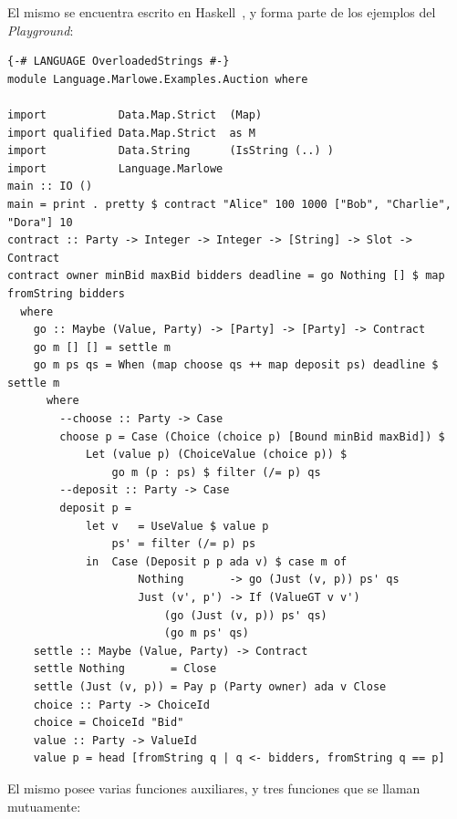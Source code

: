 \documentclass[12pt]{book}
\begin{document}
El mismo se encuentra escrito en Haskell~\cite{auction_haskell}, y forma parte de los ejemplos del \textit{Playground}:


\begin{lstlisting}[style=Haskell-cardano, caption=Contrato \textit{Auction} escrito en Marlowe]
{-# LANGUAGE OverloadedStrings #-}
module Language.Marlowe.Examples.Auction where

import           Data.Map.Strict  (Map)
import qualified Data.Map.Strict  as M
import           Data.String      (IsString (..) )
import           Language.Marlowe
main :: IO ()
main = print . pretty $ contract "Alice" 100 1000 ["Bob", "Charlie", "Dora"] 10
contract :: Party -> Integer -> Integer -> [String] -> Slot -> Contract
contract owner minBid maxBid bidders deadline = go Nothing [] $ map fromString bidders
  where
    go :: Maybe (Value, Party) -> [Party] -> [Party] -> Contract
    go m [] [] = settle m
    go m ps qs = When (map choose qs ++ map deposit ps) deadline $ settle m
      where
        --choose :: Party -> Case
        choose p = Case (Choice (choice p) [Bound minBid maxBid]) $
            Let (value p) (ChoiceValue (choice p)) $
                go m (p : ps) $ filter (/= p) qs
        --deposit :: Party -> Case
        deposit p =
            let v   = UseValue $ value p
                ps' = filter (/= p) ps
            in  Case (Deposit p p ada v) $ case m of
                    Nothing       -> go (Just (v, p)) ps' qs
                    Just (v', p') -> If (ValueGT v v')
                        (go (Just (v, p)) ps' qs)
                        (go m ps' qs)
    settle :: Maybe (Value, Party) -> Contract
    settle Nothing       = Close
    settle (Just (v, p)) = Pay p (Party owner) ada v Close
    choice :: Party -> ChoiceId
    choice = ChoiceId "Bid"
    value :: Party -> ValueId
    value p = head [fromString q | q <- bidders, fromString q == p]
\end{lstlisting}

El mismo posee varias funciones auxiliares, y tres funciones que se llaman mutuamente:
\end{document}
